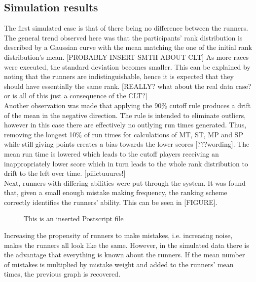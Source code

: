 \subsection{Simulation results}
The first simulated case is that of there being no difference between the runners. The general trend observed here was that the participants' rank distribution is described by a Gaussian curve with the mean matching the one of the initial rank distribution's mean. [PROBABLY INSERT SMTH ABOUT CLT] As more races were executed, the standard deviation becomes smaller. This can be explained by noting that the runners are indistinguishable, hence it is expected that they should have essentially the same rank. [REALLY? what about the real data case? or is all of this just a consequence of the CLT?]\\
Another observation was made that applying the 90\% cutoff rule produces a drift of the mean in the negative direction. The rule is intended to eliminate outliers, however in this case there are effectively no outlying run times generated. Thus, removing the longest 10\% of run times for calculations of MT, ST, MP and SP while still giving points creates a bias towards the lower scores [???wording]. The mean run time is lowered which leads to the cutoff players receiving an inappropriately lower score which in turn leads to the whole rank distribution to drift to the left over time. 
[piiictuuures!]\\
Next, runners with differing abilities were put through the system. It was found that, given a small enough mistake making frequency, the ranking scheme correctly identifies the runners' ability. This can be seen in [FIGURE].\\ 
\begin{figure}[h]     
        \begin{center}
                \leavevmode             %
                \epsfxsize=90mm         %
\end{center}
\caption{This is an inserted Postscript file}
\end{figure}
Increasing the propensity of runners to make mistakes, i.e. increasing noise, makes the runners all look like the same. However, in the simulated data there is the advantage that everything is known about the runners. If the mean number of mistakes is  multiplied by mistake weight and added to the runners' mean times, the previous graph is recovered.\\ 